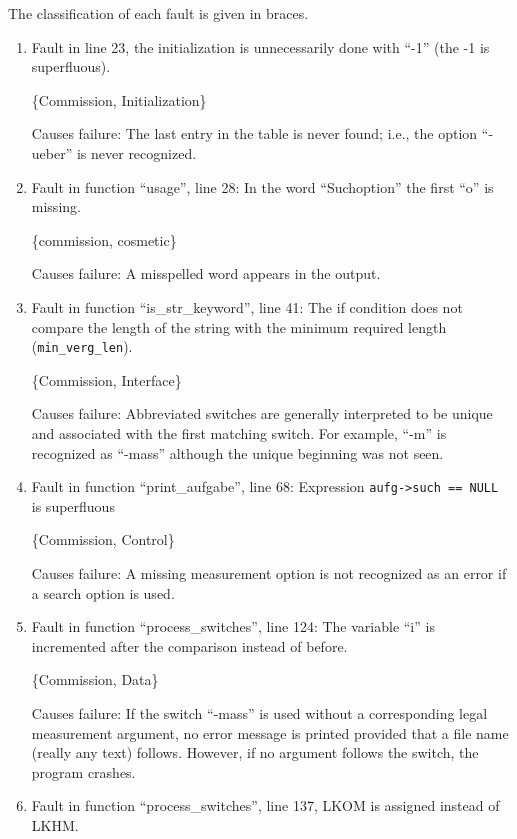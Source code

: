%
%

The classification of each fault is given in braces.

\begin{enumerate}

\item Fault in line 23, the initialization is unnecessarily done with
``-1'' (the -1 is superfluous).

\{Commission, Initialization\}

Causes failure: The last entry in the table is never found; i.e., the
option ``-ueber'' is never recognized.

\item Fault in function ``usage'', line 28: In the word ``Suchoption''
the first ``o'' is missing.

\{commission, cosmetic\}

Causes failure: A misspelled word appears in the output.

\item Fault in function ``is\_str\_keyword'', line 41: The if condition
does not compare the length of the string with the minimum required
length ({\tt min\_verg\_len}).

\{Commission, Interface\}

Causes failure: Abbreviated switches are generally interpreted to be
unique and associated with the first matching switch.
For example, ``-m'' is recognized as ``-mass'' although the unique
beginning was not seen.

\item Fault in function ``print\_aufgabe'', line 68:  Expression
{\tt aufg->such == NULL} is superfluous

\{Commission, Control\}
	
Causes failure: A missing measurement option is not recognized as an
error if a search option is used.

\item Fault in function ``process\_switches'', line 124: 
The variable ``i'' is incremented after the comparison instead of
before.

\{Commission, Data\}

Causes failure: If the switch ``-mass'' is used without a corresponding
legal measurement argument, no error message is printed provided that
a file name (really any text) follows.  However, if no argument
follows the switch, the program crashes. 

\item Fault in function ``process\_switches'', line 137, LKOM is
assigned instead of LKHM.


\end{enumerate}
